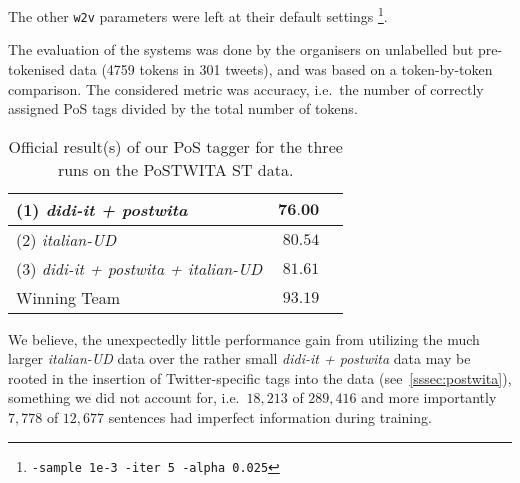 \documentclass[11pt]{article}
\newcommand\wtv{\texttt{w2v}\xspace}
\begin{document}
The other \wtv parameters were left at their default settings%
\footnote{\texttt{-sample 1e-3 -iter 5 -alpha 0.025}}.

The evaluation of the systems was done by the organisers on unlabelled but
pre-tokenised data (4759 tokens in 301 tweets), and was based on a
token-by-token comparison.
The considered metric was accuracy, i.e.~the number of correctly assigned PoS
tags divided by the total number of tokens.

\begin{table}[h]
\begin{center}
\begin{tabular}{l|r|r}
\hline
\textbf{(1)} \textbf{\emph{didi-it + postwita}}   & $\textbf{76.00}$        \\ \hline
(2) \emph{italian-UD}           & $80.54$        \\ \hline
(3) \emph{didi-it + postwita + italian-UD} & $81.61$  \\ \hline\hline
Winning Team                    & $93.19$        \\ \hline
\end{tabular}
\end{center}
\caption{\label{tab:results}Official result(s) of our PoS tagger for the
three runs on the PoSTWITA ST data.
} 
\end{table}

We believe, the unexpectedly little performance gain from utilizing the much
larger \emph{italian-UD} data over the rather small \emph{didi-it + postwita}
data may be rooted in the insertion of Twitter-specific tags into the data
(see~\ref{sssec:postwita}), something we did not account for, i.e.~$18,213$ of
$289,416$ and more importantly $7,778$ of $12,677$ sentences had imperfect
information during training. 

\end{document}
